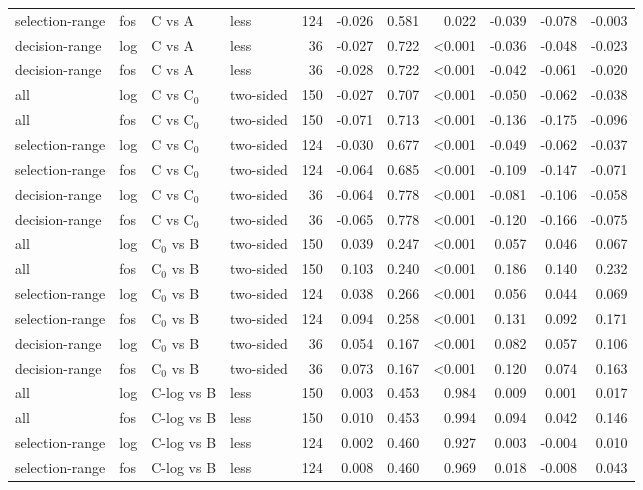 \begin{longtable}{llllrrrrrrr}
selection-range & fos & C vs A & less & 124 & -0.026 & 0.581 & 0.022 & -0.039 & -0.078 & -0.003 \\
decision-range & log & C vs A & less & 36 & -0.027 & 0.722 & <0.001 & -0.036 & -0.048 & -0.023 \\
decision-range & fos & C vs A & less & 36 & -0.028 & 0.722 & <0.001 & -0.042 & -0.061 & -0.020 \\
all & log & C vs C$_0$ & two-sided & 150 & -0.027 & 0.707 & <0.001 & -0.050 & -0.062 & -0.038 \\
all & fos & C vs C$_0$ & two-sided & 150 & -0.071 & 0.713 & <0.001 & -0.136 & -0.175 & -0.096 \\
selection-range & log & C vs C$_0$ & two-sided & 124 & -0.030 & 0.677 & <0.001 & -0.049 & -0.062 & -0.037 \\
selection-range & fos & C vs C$_0$ & two-sided & 124 & -0.064 & 0.685 & <0.001 & -0.109 & -0.147 & -0.071 \\
decision-range & log & C vs C$_0$ & two-sided & 36 & -0.064 & 0.778 & <0.001 & -0.081 & -0.106 & -0.058 \\
decision-range & fos & C vs C$_0$ & two-sided & 36 & -0.065 & 0.778 & <0.001 & -0.120 & -0.166 & -0.075 \\
all & log & C$_0$ vs B & two-sided & 150 & 0.039 & 0.247 & <0.001 & 0.057 & 0.046 & 0.067 \\
all & fos & C$_0$ vs B & two-sided & 150 & 0.103 & 0.240 & <0.001 & 0.186 & 0.140 & 0.232 \\
selection-range & log & C$_0$ vs B & two-sided & 124 & 0.038 & 0.266 & <0.001 & 0.056 & 0.044 & 0.069 \\
selection-range & fos & C$_0$ vs B & two-sided & 124 & 0.094 & 0.258 & <0.001 & 0.131 & 0.092 & 0.171 \\
decision-range & log & C$_0$ vs B & two-sided & 36 & 0.054 & 0.167 & <0.001 & 0.082 & 0.057 & 0.106 \\
decision-range & fos & C$_0$ vs B & two-sided & 36 & 0.073 & 0.167 & <0.001 & 0.120 & 0.074 & 0.163 \\
all & log & C-log vs B & less & 150 & 0.003 & 0.453 & 0.984 & 0.009 & 0.001 & 0.017 \\
all & fos & C-log vs B & less & 150 & 0.010 & 0.453 & 0.994 & 0.094 & 0.042 & 0.146 \\
selection-range & log & C-log vs B & less & 124 & 0.002 & 0.460 & 0.927 & 0.003 & -0.004 & 0.010 \\
selection-range & fos & C-log vs B & less & 124 & 0.008 & 0.460 & 0.969 & 0.018 & -0.008 & 0.043 \\

\end{longtable}
